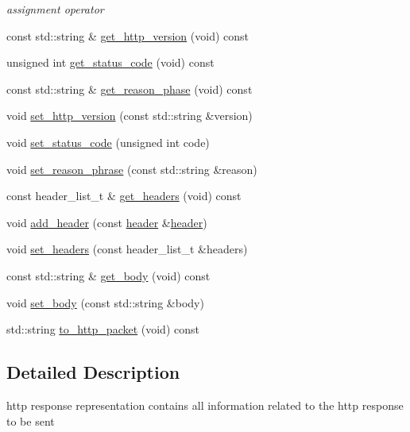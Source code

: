 \begin{DoxyCompactItemize}
\begin{DoxyCompactList}\small\item\em assignment operator \end{DoxyCompactList}\item 
const std\+::string \& \hyperlink{classnetflex_1_1http_1_1response_a1f6462ae67d321210e3acba1cbc91674}{get\+\_\+http\+\_\+version} (void) const
\item 
unsigned int \hyperlink{classnetflex_1_1http_1_1response_a3bd6c8c90f81524c4facecb5c100d753}{get\+\_\+status\+\_\+code} (void) const
\item 
const std\+::string \& \hyperlink{classnetflex_1_1http_1_1response_a3c09893bbf3974704fbe594f63cecdb4}{get\+\_\+reason\+\_\+phase} (void) const
\item 
void \hyperlink{classnetflex_1_1http_1_1response_af183e759ed09bb71eb838fa69fa0c1bf}{set\+\_\+http\+\_\+version} (const std\+::string \&version)
\item 
void \hyperlink{classnetflex_1_1http_1_1response_a8aead942bd679932d47047cf0cd9298e}{set\+\_\+status\+\_\+code} (unsigned int code)
\item 
void \hyperlink{classnetflex_1_1http_1_1response_abd5b17d8d4291f17351a8e6182a0a073}{set\+\_\+reason\+\_\+phrase} (const std\+::string \&reason)
\item 
const header\+\_\+list\+\_\+t \& \hyperlink{classnetflex_1_1http_1_1response_aee706c42e2d04c91a5332b90f9741237}{get\+\_\+headers} (void) const
\item 
void \hyperlink{classnetflex_1_1http_1_1response_ae6b96db147ca22d2c3f5fe9b399b6cdb}{add\+\_\+header} (const \hyperlink{structnetflex_1_1http_1_1header}{header} \&\hyperlink{structnetflex_1_1http_1_1header}{header})
\item 
void \hyperlink{classnetflex_1_1http_1_1response_af1e5a84c152c64b17bf029d94a551635}{set\+\_\+headers} (const header\+\_\+list\+\_\+t \&headers)
\item 
const std\+::string \& \hyperlink{classnetflex_1_1http_1_1response_a13222bdab2d580652cec32177fbfaa0e}{get\+\_\+body} (void) const
\item 
void \hyperlink{classnetflex_1_1http_1_1response_adc5c33e406d082e71d9803433136a685}{set\+\_\+body} (const std\+::string \&body)
\item 
std\+::string \hyperlink{classnetflex_1_1http_1_1response_a5e6e4e483bee30dacbe6b6685201ddd0}{to\+\_\+http\+\_\+packet} (void) const
\end{DoxyCompactItemize}


\subsection{Detailed Description}
http response representation contains all information related to the http response to be sent 

